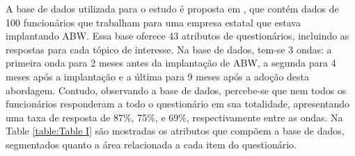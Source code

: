 \documentclass[kdmile,a4paper]{kdmile} %
\begin{document}
A base de dados utilizada para o estudo é proposta em \cite{HALLDORSSON2022107920}, que contém dados de 100 funcionários que trabalham para uma empresa estatal que estava implantando ABW. Essa base oferece 43 atributos de questionários, incluindo as respostas para cada tópico de interesse. Na base de dados, tem-se 3 ondas: a primeira onda para 2 meses antes da implantação de ABW, a segunda para 4 meses após a implantação e a última para 9 meses após a adoção desta abordagem. Contudo, observando a base de dados, percebe-se que nem todos os funcionários responderam a todo o questionário em sua totalidade, apresentando uma taxa de resposta de 87\%, 75\%, e 69\%, respectivamente entre as ondas. Na Table \ref{table:Table I} são mostradas os atributos que compõem a base de dados, segmentados quanto a área relacionada a cada item do questionário. 
\end{document}
